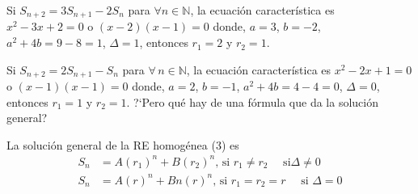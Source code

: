 \begin{example}{}
Si $S_{n+2} = 3S_{n+1}-2S_{n}$ para $\forall n\in\mathds{N}$, la ecuación característica es $x^2-3x+2=0$ o $(x-2)(x-1)=0$ donde, $a=3$, $b=-2$, $a^2+4b=9-8=1$, $\Delta = 1$, entonces $r_1=2$ y $r_2=1$.
\end{example}

\begin{example}{}
Si $S_{n+2}=2S_{n+1}-S_{n}$ para $\forall\,n\in\mathds{N}$, la ecuación característica es $x^{2}-2x+1=0$ o $(x-1)(x-1)=0$ donde, $a=2$, $b=-1$, $a^2+4b=4-4=0$, $\Delta = 0$, entonces $r_{1}=1$ y $r_{2}=1$. ?`Pero qué hay de una fórmula que da la solución general?
\end{example}

\begin{theorem}
La solución general de la RE homogénea (3) es
	\begin{align*}
		S_{n}&=A(r_1)^{n}+B(r_2)^{n}\text{, si }r_{1}\neq r_{2}\quad\text{ si}\Delta\neq0\\
		S_{n}&=A(r)^n+Bn(r)^{n}\text{, si }r_{1}=r_{2}=r\quad\text{ si }\Delta=0
	\end{align*}
\end{theorem}
